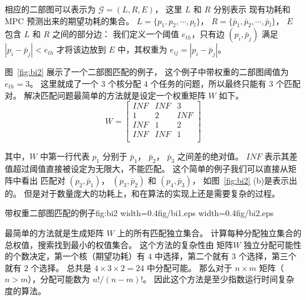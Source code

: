 相应的二部图可以表示为 $\mathcal{G} = (L, R, E)$，
这里 $L$ 和 $R$ 分别表示 现有功耗和 MPC 预测出来的期望功耗的集合。
$L = \{p_1, p_2, \cdots, p_l\}$， $R = \{\bar{p}_1,
\bar{p}_2, \cdots, \bar{p}_l\}$，
 $E$ 包含 $L$ 和 $R$ 之间的部分边：
 我们定义一个阈值 $e_{th}$，只有边 $(p_i, \bar{p}_j)$ 满足 $|p_i-\bar{p}_j|<e_{th}$ 才将该边放到 $E$ 中，其权重为 $e_{ij} = |p_i-\bar{p}_j|$。
 
 图~\ref{fig:bi2} 展示了一个二部图匹配的例子， 这个例子中带权重的二部图阈值为 $e_{th}=3$。
 这里就成了一个 $3$ 个核分配 $4 $ 个任务的问题，所以最终只能有 $3$ 个匹配对。
 解决匹配问题最简单的方法就是设定一个权重矩阵 $W$ 如下。
 \begin{equation}
W= 
\left[
\begin{array}{ccc}
INF & INF & 3   \\
1   &  2  & INF  \\
INF &  1  & 2   \\
INF & INF & 1    \\
\end{array}
\right]
\end{equation}

其中，$W$ 中第一行代表 $p_1$ 分别于 $\bar{p}_1$， $\bar{p}_2$， $\bar{p}_3$ 之间差的绝对值。  
$INF $ 表示其差值超过阈值直接被设定为无限大，不能匹配。
这个简单的例子我们可以直接从矩阵中看出 匹配对 $(p_2, \bar{p}_1)$， $(p_3, \bar{p}_2)$ 和 $(p_4, \bar{p}_3)$， 如图~\ref{fig:bi2} (b)是表示出的。
但是对于数量庞大的功耗上，和在算法的实现上还是需要复杂的过程。

 \begin{pics}[H]{带权重二部图匹配的例子}{fig:bi2}
   {width=0.4\columnwidth}{fig/bi1.eps}
   {width=0.4\columnwidth}{fig/bi2.eps}
 \end{pics}

最简单的方法就是生成矩阵 $W$ 上的所有匹配独立集合。 计算每种分配独立集合的总权值，搜索找到最小的权值集合。
这个方法的复杂性由 矩阵$W$ 独立分配可能性的个数决定，第一个核（期望功耗）有 $4$ 中选择，第二个就有 $3$ 个选择，第三个就有 $2$ 个选择。
总共是  $4 \times 3 \times 2 = 24$ 中分配可能。 那么对于 $ n\times m$ 矩阵（$n > m$），分配可能数为 $n!/(n-m)!$。
因此这个方法是至少指数运行时间复杂度的算法。

